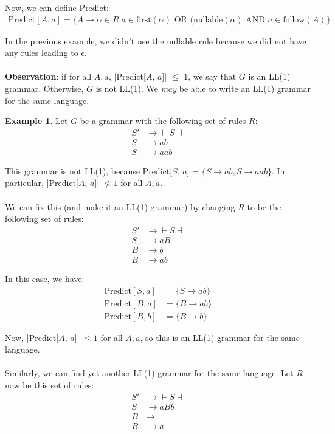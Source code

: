 \documentclass[]{article}
\theoremstyle{definition}
\newtheorem{ex}{Example}[section]
\begin{document}
				Now, we can define Predict:
				\begin{align*}
					\text{Predict}[A, a] = \{A \to \alpha \in R | a \in \text{first}(\alpha) \text{ OR } (\text{nullable}(\alpha) \text{ AND } a \in \text{follow}(A)\}
				\end{align*}

				In the previous example, we didn't use the nullable rule because we did not have any rules leading to $\epsilon$.
				\\ \\
				\textbf{Observation}: if for all $A, a$, |Predict[$A$, $a$]| $\le$ 1, we say that $G$ is an LL(1) grammar. Otherwise, $G$ is not LL(1). We \emph{may} be able to write an LL(1) grammar for the same language.
				\begin{ex}
					Let $G$ be a grammar with the following set of rules $R$:
					\begin{align*}
						S' &\to{} \vdash S \dashv \\
						S &\to ab \\
						S &\to aab
					\end{align*}

					This grammar is not LL(1), because Predict[$S$, $a$] = $\{S \to ab, S \to aab\}$. In particular, |Predict[$A$, $a$]| $\not \le 1$ for all $A, a$.
					\\ \\
					We can fix this (and make it an LL(1) grammar) by changing $R$ to be the following set of rules:
					\begin{align*}
						S' &\to{} \vdash S \dashv \\
						S &\to aB \\
						B &\to b \\
						B &\to ab
					\end{align*}

					In this case, we have:
					\begin{align*}
						\text{Predict}[S, a] &= \{S \to ab\} \\
						\text{Predict}[B, a] &= \{B \to ab\} \\
						\text{Predict}[B, b] &= \{B \to b\}
					\end{align*}

					Now, |Predict[$A$, $a$]| $\le 1$ for all $A, a$, so this is an LL(1) grammar for the same language.
					\\ \\
					Similarly, we can find yet another LL(1) grammar for the same language. Let $R$ now be this set of rules:
					\begin{align*}
						S' &\to{} \vdash S \dashv \\
						S &\to aBb \\
						B &\to \\
						B &\to a
					\end{align*}


\end{ex}
\end{document}
